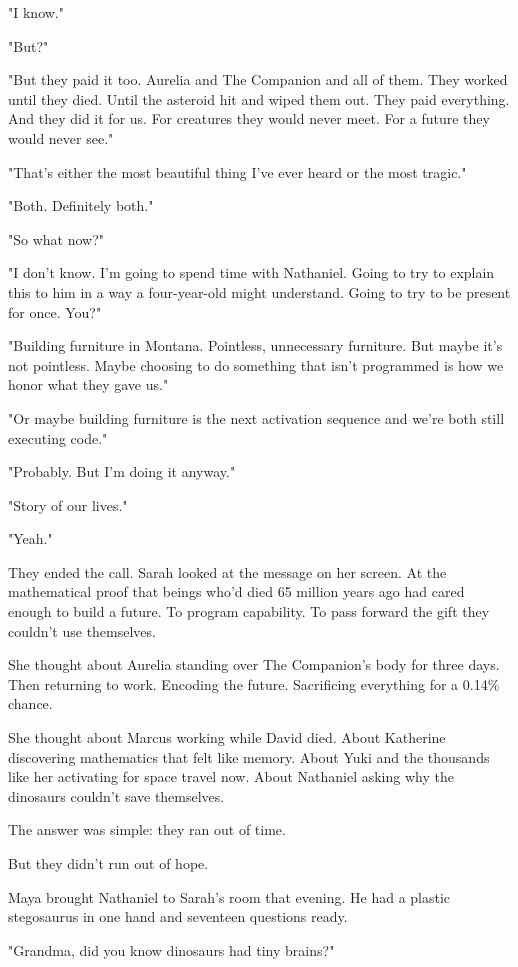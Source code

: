 "I know."

"But?"

"But they paid it too. Aurelia and The Companion and all of them. They worked until they died. Until the asteroid hit and wiped them out. They paid everything. And they did it for us. For creatures they would never meet. For a future they would never see."

"That's either the most beautiful thing I've ever heard or the most tragic."

"Both. Definitely both."

"So what now?"

"I don't know. I'm going to spend time with Nathaniel. Going to try to explain this to him in a way a four-year-old might understand. Going to try to be present for once. You?"

"Building furniture in Montana. Pointless, unnecessary furniture. But maybe it's not pointless. Maybe choosing to do something that isn't programmed is how we honor what they gave us."

"Or maybe building furniture is the next activation sequence and we're both still executing code."

"Probably. But I'm doing it anyway."

"Story of our lives."

"Yeah."

They ended the call. Sarah looked at the message on her screen. At the mathematical proof that beings who'd died 65 million years ago had cared enough to build a future. To program capability. To pass forward the gift they couldn't use themselves.

She thought about Aurelia standing over The Companion's body for three days. Then returning to work. Encoding the future. Sacrificing everything for a 0.14\% chance.

She thought about Marcus working while David died. About Katherine discovering mathematics that felt like memory. About Yuki and the thousands like her activating for space travel now. About Nathaniel asking why the dinosaurs couldn't save themselves.

The answer was simple: they ran out of time.

But they didn't run out of hope.

\scenebreak

Maya brought Nathaniel to Sarah's room that evening. He had a plastic stegosaurus in one hand and seventeen questions ready.

"Grandma, did you know dinosaurs had tiny brains?"

